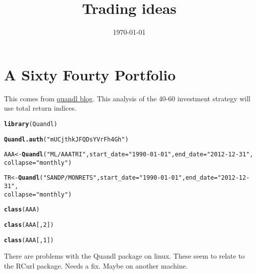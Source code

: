 \documentclass[12pt, a4paper, oneside]{article}\usepackage[]{graphicx}\usepackage[]{color}
\makeatletter
\newcommand{\hlstr}[1]{\textcolor[rgb]{0.192,0.494,0.8}{#1}}%
\newcommand{\hlkwd}[1]{\textcolor[rgb]{0.737,0.353,0.396}{\textbf{#1}}}%
\newenvironment{kframe}{%
 \def\at@end@of@kframe{}%
 \ifinner\ifhmode%
  \def\at@end@of@kframe{\end{minipage}}%
  \begin{minipage}{\columnwidth}%
 \fi\fi%
 \def\FrameCommand##1{\hskip\@totalleftmargin \hskip-\fboxsep
 \colorbox{shadecolor}{##1}\hskip-\fboxsep
     \hskip-\linewidth \hskip-\@totalleftmargin \hskip\columnwidth}%
 \MakeFramed {\advance\hsize-\width
   \@totalleftmargin\z@ \linewidth\hsize
   \@setminipage}}%
 {\par\unskip\endMakeFramed%
 \at@end@of@kframe}
\newenvironment{knitrout}{}{} %
\makeatother
\begin{document}
\title{Trading ideas}
\date{\today}
\maketitle

\section{A Sixty Fourty Portfolio}
This comes from \href{http://blog.quandl.com/blog/using-r-to-model-the-classic-6040-investing-rule/}{quandl blog}. This analysis of the 40-60 investment strategy will use total return indices. 
\begin{knitrout}
\color{fgcolor}\begin{kframe}
\begin{alltt}
\hlkwd{library}(Quandl)
\end{alltt}


{\ttfamily\noindent\bfseries\color{errorcolor}{\#\# Error: there is no package called 'Quandl'}}\begin{alltt}
\hlkwd{Quandl.auth}(\hlstr{"mUCjthkJFQDsYVrFh4Gh"})
\end{alltt}


{\ttfamily\noindent\bfseries{}}\begin{alltt}
AAA <- \hlkwd{Quandl}(\hlstr{"ML/AAATRI"}, start_date = \hlstr{"1990-01-01"}, end_date = \hlstr{"2012-12-31"}, 
    collapse = \hlstr{"monthly"})
\end{alltt}


{\ttfamily\noindent\bfseries{}}\begin{alltt}
TR <- \hlkwd{Quandl}(\hlstr{"SANDP/MONRETS"}, start_date = \hlstr{"1990-01-01"}, end_date = \hlstr{"2012-12-31"}, 
    collapse = \hlstr{"monthly"})
\end{alltt}


{\ttfamily\noindent\bfseries{}}\begin{alltt}
\hlkwd{class}(AAA)
\end{alltt}


{\ttfamily\noindent\bfseries\color{errorcolor}{\#\# Error: object 'AAA' not found}}\begin{alltt}
\hlkwd{class}(AAA[, 2])
\end{alltt}


{\ttfamily\noindent\bfseries\color{errorcolor}{\#\# Error: object 'AAA' not found}}\begin{alltt}
\hlkwd{class}(AAA[, 1])
\end{alltt}


{\ttfamily\noindent\bfseries\color{errorcolor}{\#\# Error: object 'AAA' not found}}\end{kframe}
\end{knitrout}

There are problems with the Quandl package on linux.  These seem to relate to the RCurl package.  Needs a fix.  Maybe on another machine. 
\end{document}
